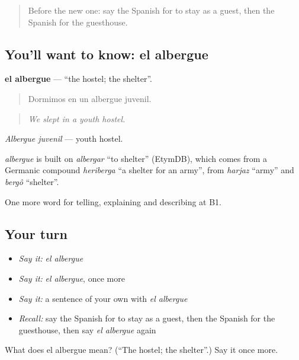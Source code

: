 \label{lesson:ES-C660-albergue}



\begin{quote}
Before the new one: say the Spanish for to stay as a guest, then the Spanish for the guesthouse.
\end{quote}

\subsection*{You'll want to know: el albergue}
\textbf{el albergue} — \textquotedblleft{}the hostel; the shelter\textquotedblright{}.

\begin{quote}
Dormimos en un albergue juvenil.
\end{quote}

\begin{quote}
\emph{We slept in a youth hostel.}
\end{quote}

\emph{Albergue juvenil} — youth hostel.

\begin{cousinweb}
\emph{albergue} is built on \emph{albergar} \textquotedblleft{}to shelter\textquotedblright{} (EtymDB), which comes from a Germanic compound \emph{heriberga} \textquotedblleft{}a shelter for an army\textquotedblright{}, from \emph{harjaz} \textquotedblleft{}army\textquotedblright{} and \emph{bergô} \textquotedblleft{}shelter\textquotedblright{}.
\end{cousinweb}

\begin{grammarlens}[title={What you've built}]
One more word for telling, explaining and describing at B1.
\end{grammarlens}

\subsection*{Your turn}
\begin{itemize}
\raggedright
  \item \emph{Say it:} \emph{el albergue}
  \item \emph{Say it:} \emph{el albergue}, once more
  \item \emph{Say it:} a sentence of your own with \emph{el albergue}
  \item \emph{Recall:} say the Spanish for to stay as a guest, then the Spanish for the guesthouse, then say \emph{el albergue} again
\end{itemize}

\begin{tcolorbox}[breakable,colback=teal!4,colframe=teal!35!black,title={Before you move on}]
What does el albergue mean? (\textquotedblleft{}The hostel; the shelter\textquotedblright{}.) Say it once more.
\end{tcolorbox}

